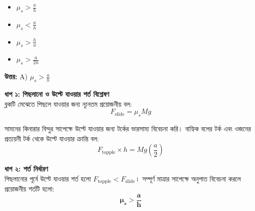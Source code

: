 \documentclass[12pt, a4paper]{article}
\begin{document}
{{\begin{center}
\end{center}
\vspace{1em}

\begin{itemize}[label={}, leftmargin=1cm, itemsep=0.5em]
    \item[\textbf{A)}] $\mu_s > \frac{a}{h}$
    \item[\textbf{B)}] $\mu_s < \frac{a}{h}$
    \item[\textbf{C)}] $\mu_s > \frac{h}{a}$
    \item[\textbf{D)}] $\mu_s > \frac{a}{2h}$
\end{itemize}

\vspace{0.5em}
\begin{tcolorbox}[answerbox]
    \textbf{\color{success} উত্তর:} A) $\mu_s > \frac{a}{h}$
\end{tcolorbox}
\vspace{1em}

\begin{tcolorbox}[solutionbox={সমাধান (Solution)}]
    \noindent
    \textbf{ধাপ ১: পিছলানো ও উল্টে যাওয়ার শর্ত বিশ্লেষণ} \\
    ব্লকটি মেঝেতে পিছলে যাওয়ার জন্য ন্যূনতম প্রয়োজনীয় বল:
    \[ F_{\text{slide}} = \mu_s M g \]
    
    সামনের কিনারার বিন্দুর সাপেক্ষে উল্টে যাওয়ার জন্য টর্কের ভারসাম্য বিবেচনা করি। বাহ্যিক বলের টর্ক এবং ওজনের প্রত্যয়নী টর্ক থেকে উল্টে যাওয়ার ক্রান্তি বল:
    \[ F_{\text{topple}} \times h = M g \left(\frac{a}{2}\right) \]
    
    \vspace{0.5em}
    \noindent\textbf{ধাপ ২: শর্ত নির্ধারণ} \\
    পিছলানোর পূর্বে উল্টে যাওয়ার শর্ত হলো $F_{\text{topple}} < F_{\text{slide}}$। সম্পূর্ণ মাত্রার সাপেক্ষে অনুপাত বিবেচনা করলে প্রয়োজনীয় শর্তটি হলো:
    \[ \mathbf{\mu_s > \frac{a}{h}} \]
\end{tcolorbox}

}}
\end{document}
